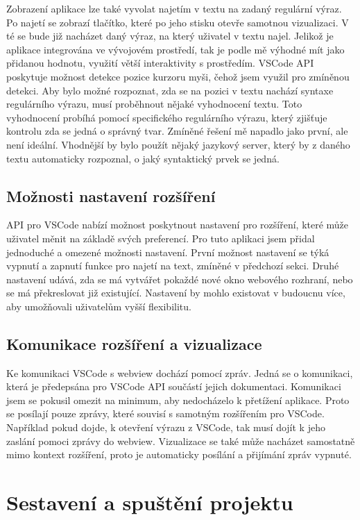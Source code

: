 Zobrazení aplikace lze také vyvolat najetím v textu na zadaný regulární výraz.
Po najetí se zobrazí tlačítko, které po jeho stisku otevře samotnou vizualizaci.
V té se bude již nacházet daný výraz, na který uživatel v textu najel.
Jelikož je aplikace integrována ve vývojovém prostředí, tak je podle mě výhodné mít jako přidanou hodnotu, využití větší interaktivity s prostředím.
VSCode API poskytuje možnost detekce pozice kurzoru myši, čehož jsem využil pro zmíněnou detekci.
Aby bylo možné rozpoznat, zda se na pozici v textu nachází syntaxe regulárního výrazu, musí proběhnout nějaké vyhodnocení textu.
Toto vyhodnocení probíhá pomocí specifického regulárního výrazu, který zjišťuje kontrolu zda se jedná o správný tvar.
Zmíněné řešení mě napadlo jako první, ale není ideální.
Vhodnější by bylo použít nějaký jazykový server, který by z daného textu automaticky rozpoznal, o jaký syntaktický prvek se jedná.

\subsection*{Možnosti nastavení rozšíření}

API pro VSCode nabízí možnost poskytnout nastavení pro rozšíření, které může uživatel měnit na základě svých preferencí.
Pro tuto aplikaci jsem přidal jednoduché a omezené možnosti nastavení.
První možnost nastavení se týká vypnutí a zapnutí funkce pro najetí na text, zmíněné v předchozí sekci.
Druhé nastavení udává, zda se má vytvářet pokaždé nové okno webového rozhraní, nebo se má překreslovat již existující.
Nastavení by mohlo existovat v budoucnu více, aby umožňovali uživatelům vyšší flexibilitu. 

\subsection*{Komunikace rozšíření a vizualizace}

Ke komunikaci VSCode s webview dochází pomocí zpráv.
Jedná se o komunikaci, která je předepsána pro VSCode API součástí jejich dokumentaci.
Komunikaci jsem se pokusil omezit na minimum, aby nedocházelo k přetížení aplikace.
Proto se posílají pouze zprávy, které souvisí s samotným rozšířením pro VSCode.
Například pokud dojde, k otevření výrazu z VSCode, tak musí dojít k jeho zaslání pomoci zprávy do webview.
Vizualizace se také může nacházet samostatně mimo kontext rozšíření, proto je automaticky posílání a přijímání zpráv vypnuté.

\section{Sestavení a spuštění projektu}

